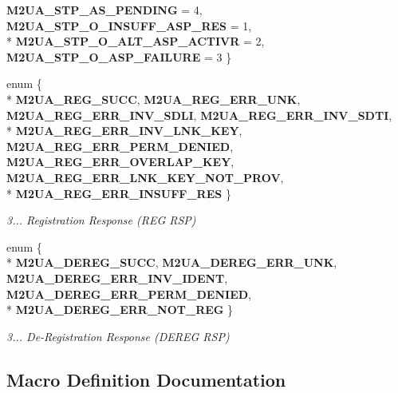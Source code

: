 \begin{DoxyCompactItemize}
{\bf M2\+U\+A\+\_\+\+S\+T\+P\+\_\+\+A\+S\+\_\+\+P\+E\+N\+D\+I\+NG} = 4, 
{\bf M2\+U\+A\+\_\+\+S\+T\+P\+\_\+\+O\+\_\+\+I\+N\+S\+U\+F\+F\+\_\+\+A\+S\+P\+\_\+\+R\+ES} = 1, 
\\*
{\bf M2\+U\+A\+\_\+\+S\+T\+P\+\_\+\+O\+\_\+\+A\+L\+T\+\_\+\+A\+S\+P\+\_\+\+A\+C\+T\+I\+VR} = 2, 
{\bf M2\+U\+A\+\_\+\+S\+T\+P\+\_\+\+O\+\_\+\+A\+S\+P\+\_\+\+F\+A\+I\+L\+U\+RE} = 3
 \}
\item 
enum \{ \\*
{\bf M2\+U\+A\+\_\+\+R\+E\+G\+\_\+\+S\+U\+CC}, 
{\bf M2\+U\+A\+\_\+\+R\+E\+G\+\_\+\+E\+R\+R\+\_\+\+U\+NK}, 
{\bf M2\+U\+A\+\_\+\+R\+E\+G\+\_\+\+E\+R\+R\+\_\+\+I\+N\+V\+\_\+\+S\+D\+LI}, 
{\bf M2\+U\+A\+\_\+\+R\+E\+G\+\_\+\+E\+R\+R\+\_\+\+I\+N\+V\+\_\+\+S\+D\+TI}, 
\\*
{\bf M2\+U\+A\+\_\+\+R\+E\+G\+\_\+\+E\+R\+R\+\_\+\+I\+N\+V\+\_\+\+L\+N\+K\+\_\+\+K\+EY}, 
{\bf M2\+U\+A\+\_\+\+R\+E\+G\+\_\+\+E\+R\+R\+\_\+\+P\+E\+R\+M\+\_\+\+D\+E\+N\+I\+ED}, 
{\bf M2\+U\+A\+\_\+\+R\+E\+G\+\_\+\+E\+R\+R\+\_\+\+O\+V\+E\+R\+L\+A\+P\+\_\+\+K\+EY}, 
{\bf M2\+U\+A\+\_\+\+R\+E\+G\+\_\+\+E\+R\+R\+\_\+\+L\+N\+K\+\_\+\+K\+E\+Y\+\_\+\+N\+O\+T\+\_\+\+P\+R\+OV}, 
\\*
{\bf M2\+U\+A\+\_\+\+R\+E\+G\+\_\+\+E\+R\+R\+\_\+\+I\+N\+S\+U\+F\+F\+\_\+\+R\+ES}
 \}\begin{DoxyCompactList}\small\item\em 3... Registration Response (R\+EG R\+SP) \end{DoxyCompactList}
\item 
enum \{ \\*
{\bf M2\+U\+A\+\_\+\+D\+E\+R\+E\+G\+\_\+\+S\+U\+CC}, 
{\bf M2\+U\+A\+\_\+\+D\+E\+R\+E\+G\+\_\+\+E\+R\+R\+\_\+\+U\+NK}, 
{\bf M2\+U\+A\+\_\+\+D\+E\+R\+E\+G\+\_\+\+E\+R\+R\+\_\+\+I\+N\+V\+\_\+\+I\+D\+E\+NT}, 
{\bf M2\+U\+A\+\_\+\+D\+E\+R\+E\+G\+\_\+\+E\+R\+R\+\_\+\+P\+E\+R\+M\+\_\+\+D\+E\+N\+I\+ED}, 
\\*
{\bf M2\+U\+A\+\_\+\+D\+E\+R\+E\+G\+\_\+\+E\+R\+R\+\_\+\+N\+O\+T\+\_\+\+R\+EG}
 \}\begin{DoxyCompactList}\small\item\em 3... De-\/\+Registration Response (D\+E\+R\+EG R\+SP) \end{DoxyCompactList}
\end{DoxyCompactItemize}


\subsection{Macro Definition Documentation}
